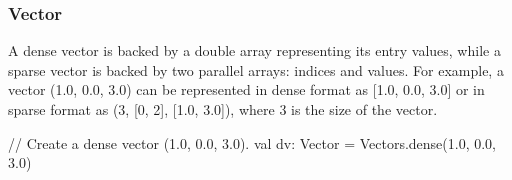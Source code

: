 \documentclass{beamer}
\newcommand{\beb}{\begin{exampleblock}}
\newcommand{\eeb}{\end{exampleblock}}
\begin{document}


\begin{frame}[fragile]
\frametitle{Vector}

A dense vector is backed by a double array representing its entry values, 
while a sparse vector is backed by two parallel arrays: indices and values. 
For example, a vector (1.0, 0.0, 3.0) can be represented in dense format as [1.0, 0.0, 3.0] 
or in sparse format as (3, [0, 2], [1.0, 3.0]), where 3 is the size of the vector.
\beb
\begin{code}
// Create a dense vector (1.0, 0.0, 3.0).
val dv: Vector = Vectors.dense(1.0, 0.0, 3.0)
\end{code}
\eeb
\end{frame}
\end{document}
